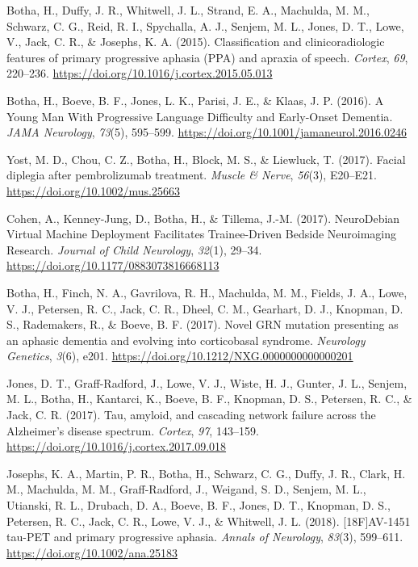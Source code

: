 \documentclass[11pt, a4paper]{awesome-cv}
\begin{document}
\leavevmode\hypertarget{ref-botha_classification_2015}{}%
Botha, H., Duffy, J. R., Whitwell, J. L., Strand, E. A., Machulda, M.
M., Schwarz, C. G., Reid, R. I., Spychalla, A. J., Senjem, M. L., Jones,
D. T., Lowe, V., Jack, C. R., \& Josephs, K. A. (2015). Classification
and clinicoradiologic features of primary progressive aphasia ({PPA})
and apraxia of speech. \emph{Cortex}, \emph{69}, 220--236.
\url{https://doi.org/10.1016/j.cortex.2015.05.013}

\leavevmode\hypertarget{ref-botha_young_2016}{}%
Botha, H., Boeve, B. F., Jones, L. K., Parisi, J. E., \& Klaas, J. P.
(2016). A {Young} {Man} {With} {Progressive} {Language} {Difficulty} and
{Early}-{Onset} {Dementia}. \emph{JAMA Neurology}, \emph{73}(5),
595--599. \url{https://doi.org/10.1001/jamaneurol.2016.0246}

\leavevmode\hypertarget{ref-yost_facial_2017}{}%
Yost, M. D., Chou, C. Z., Botha, H., Block, M. S., \& Liewluck, T.
(2017). Facial diplegia after pembrolizumab treatment. \emph{Muscle \&
Nerve}, \emph{56}(3), E20--E21. \url{https://doi.org/10.1002/mus.25663}

\leavevmode\hypertarget{ref-cohen_neurodebian_2017}{}%
Cohen, A., Kenney-Jung, D., Botha, H., \& Tillema, J.-M. (2017).
{NeuroDebian} {Virtual} {Machine} {Deployment} {Facilitates}
{Trainee}-{Driven} {Bedside} {Neuroimaging} {Research}. \emph{Journal of
Child Neurology}, \emph{32}(1), 29--34.
\url{https://doi.org/10.1177/0883073816668113}

\leavevmode\hypertarget{ref-botha_novel_2017}{}%
Botha, H., Finch, N. A., Gavrilova, R. H., Machulda, M. M., Fields, J.
A., Lowe, V. J., Petersen, R. C., Jack, C. R., Dheel, C. M., Gearhart,
D. J., Knopman, D. S., Rademakers, R., \& Boeve, B. F. (2017). Novel
{GRN} mutation presenting as an aphasic dementia and evolving into
corticobasal syndrome. \emph{Neurology Genetics}, \emph{3}(6), e201.
\url{https://doi.org/10.1212/NXG.0000000000000201}

\leavevmode\hypertarget{ref-jones_tau_2017}{}%
Jones, D. T., Graff-Radford, J., Lowe, V. J., Wiste, H. J., Gunter, J.
L., Senjem, M. L., Botha, H., Kantarci, K., Boeve, B. F., Knopman, D.
S., Petersen, R. C., \& Jack, C. R. (2017). Tau, amyloid, and cascading
network failure across the {Alzheimer}'s disease spectrum.
\emph{Cortex}, \emph{97}, 143--159.
\url{https://doi.org/10.1016/j.cortex.2017.09.018}

\leavevmode\hypertarget{ref-josephs_18fav-1451_2018}{}%
Josephs, K. A., Martin, P. R., Botha, H., Schwarz, C. G., Duffy, J. R.,
Clark, H. M., Machulda, M. M., Graff-Radford, J., Weigand, S. D.,
Senjem, M. L., Utianski, R. L., Drubach, D. A., Boeve, B. F., Jones, D.
T., Knopman, D. S., Petersen, R. C., Jack, C. R., Lowe, V. J., \&
Whitwell, J. L. (2018). {[}{18F}{]}{AV}-1451 tau-{PET} and primary
progressive aphasia. \emph{Annals of Neurology}, \emph{83}(3), 599--611.
\url{https://doi.org/10.1002/ana.25183}
\end{document}
